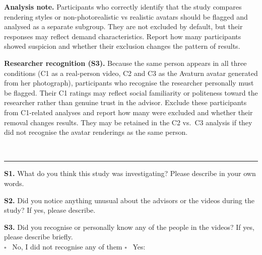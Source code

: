 \documentclass[11pt, a4paper]{article}
\newcommand{\qsection}[1]{%
  \vspace{6pt}
  \noindent{\sffamily\small\bfseries\color{konstanzblue} #1}\\[2pt]
  \noindent\rule{\linewidth}{0.3pt}
  \vspace{4pt}
}
\begin{document}
\begin{warnbox}
\small\textbf{Analysis note.} Participants who correctly identify that the study compares rendering styles or non-photorealistic vs realistic avatars should be flagged and analysed as a separate subgroup. They are not excluded by default, but their responses may reflect demand characteristics. Report how many participants showed suspicion and whether their exclusion changes the pattern of results.

\medskip
\textbf{Researcher recognition (S3).} Because the same person appears in all three conditions (C1 as a real-person video, C2 and C3 as the Avaturn avatar generated from her photograph), participants who recognise the researcher personally must be flagged. Their C1 ratings may reflect social familiarity or politeness toward the researcher rather than genuine trust in the advisor. Exclude these participants from C1-related analyses and report how many were excluded and whether their removal changes results. They may be retained in the C2 vs.\ C3 analysis if they did not recognise the avatar renderings as the same person.
\end{warnbox}

\vspace{10pt}

\qsection{A Few Final Questions}

\noindent\textbf{S1.} What do you think this study was investigating? Please describe in your own words.

\vspace{6pt}
\noindent\fbox{\begin{minipage}{\linewidth}\vspace{2.5cm}\end{minipage}}

\vspace{12pt}
\noindent\textbf{S2.} Did you notice anything unusual about the advisors or the videos during the study? If yes, please describe.

\vspace{6pt}
\noindent\fbox{\begin{minipage}{\linewidth}\vspace{2.5cm}\end{minipage}}

\vspace{12pt}
\noindent\textbf{S3.} Did you recognise or personally know any of the people in the videos? If yes, please describe briefly.\\[6pt]
$\square$ \ No, I did not recognise any of them \quad $\square$ \ Yes: \underline{\hspace{6cm}}
\end{document}
